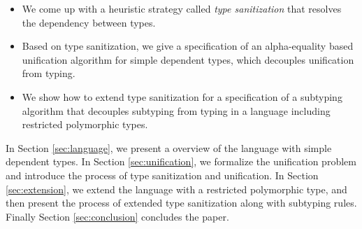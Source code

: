 \begin{itemize}
  \item We come up with a heuristic strategy called \textit{type sanitization}
    that resolves the
    dependency between types.
  \item Based on type sanitization, we give a specification of an alpha-equality
    based unification algorithm
    for simple dependent types, which
    decouples unification from typing.
  \item We show how to extend type sanitization for a specification of a
    subtyping algorithm
    that decouples
    subtyping from typing in a language including restricted polymorphic types.
\end{itemize}

In Section \ref{sec:language}, we present a overview of the language with simple
dependent types. In Section \ref{sec:unification}, we formalize the unification
problem and introduce the process of type sanitization and unification. In
Section \ref{sec:extension}, we extend the language with a restricted
polymorphic type, and then present the process of extended type sanitization
along with subtyping rules. Finally Section \ref{sec:conclusion} concludes the
paper.